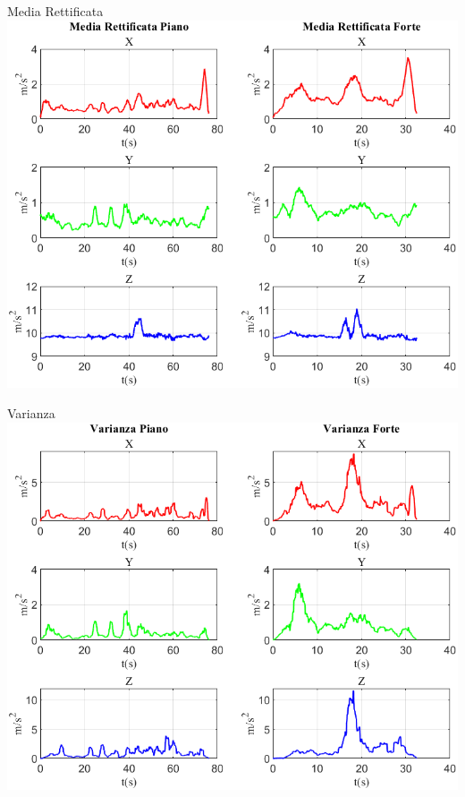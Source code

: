 \documentclass[beamer]{standalone}
\begin{document}
	\begin{frame}{{Media Rettificata}}
		\centering\includegraphics[height=.8\textheight]{figure/Acc/Media Rettificata}
	\end{frame}

	\begin{frame}{{Varianza}}
		\centering\includegraphics[height=.8\textheight]{figure/Acc/Varianza}
	\end{frame}
	
\end{document}
